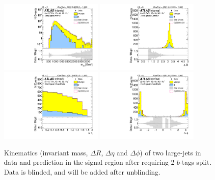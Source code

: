 \begin{figure}[htbp!]
\begin{center}
\includegraphics[width=0.45\textwidth,angle=-90]{figures/boosted/Signal/b77_TwoTag_split_Signal_mHH_l_1_blind.pdf}
\includegraphics[width=0.45\textwidth,angle=-90]{figures/boosted/Signal/b77_TwoTag_split_Signal_hCandDr_blind.pdf}\\
\includegraphics[width=0.45\textwidth,angle=-90]{figures/boosted/Signal/b77_TwoTag_split_Signal_hCandDeta_blind.pdf}
\includegraphics[width=0.45\textwidth,angle=-90]{figures/boosted/Signal/b77_TwoTag_split_Signal_hCandDphi_blind.pdf}
  \caption{Kinematics (invariant mass, $\Delta R$, $\Delta \eta$ and $\Delta \phi$) of two large-\R jets in data and prediction in the signal region after requiring 2 $b$-tags split. Data is blinded, and will be added after unblinding. }
  \label{fig:boosted-2bs-signal-blind-ak10-system}
\end{center}
\end{figure}

\clearpage



